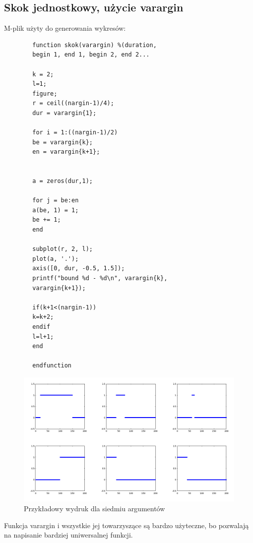 \documentclass[12pt,titlepage]{report}
\begin{document}
\subsection{Skok jednostkowy, użycie varargin}
M-plik użyty do generowania wykresów:
\begin{multicols}{3}
	{
		\tiny
		\begin{verbatim}
		function skok(varargin) %(duration,
		begin 1, end 1, begin 2, end 2...
		
		k = 2;
		l=1;
		figure;
		r = ceil((nargin-1)/4);
		dur = varargin{1};
		
		for i = 1:((nargin-1)/2)
		be = varargin{k};
		en = varargin{k+1};
		
		
		a = zeros(dur,1);
		
		for j = be:en
		a(be, 1) = 1;
		be += 1;
		end
		
		subplot(r, 2, l);
		plot(a, '.');
		axis([0, dur, -0.5, 1.5]);
		printf("bound %d - %d\n", varargin{k},
		varargin{k+1});
		
		if(k+1<(nargin-1))
		k=k+2;
		endif
		l=l+1;
		end
		
		endfunction
		\end{verbatim}
	}
\end{multicols}

\begin{figure}[!h]
	\centering
	\includegraphics[scale=0.5]{../cw05_output}
	\caption{Przykładowy wydruk dla siedmiu argumentów}
\end{figure}
Funkcja varargin i wszystkie jej towarzyszące są bardzo użyteczne, bo pozwalają na napisanie bardziej uniwersalnej funkcji.
\newpage
\end{document}
